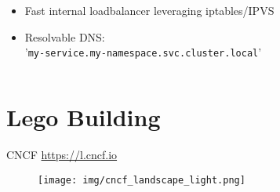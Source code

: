 \documentclass{beamer}
\begin{document}
\begin{frame}[fragile]
\begin{columns}
\begin{column}{0.6\textwidth}
{      \begin{itemize}
        \item<4-> Fast internal loadbalancer leveraging iptables/IPVS
        \item<5-> Resolvable DNS: \\
          \scriptsize{'\lstinline{my-service.my-namespace.svc.cluster.local}'}
      \end{itemize}

     }
  \end{column}
  \end{columns}

\end{frame}

\section{Lego Building}

\begin{frame}{CNCF \textendash \href{https://l.cncf.io}{https://l.cncf.io}}
  \begin{figure}
        \begin{center}
            \texttt{[image: img/cncf\_landscape\_light.png]}
        \end{center}
    \end{figure}
\end{frame}
\end{document}
